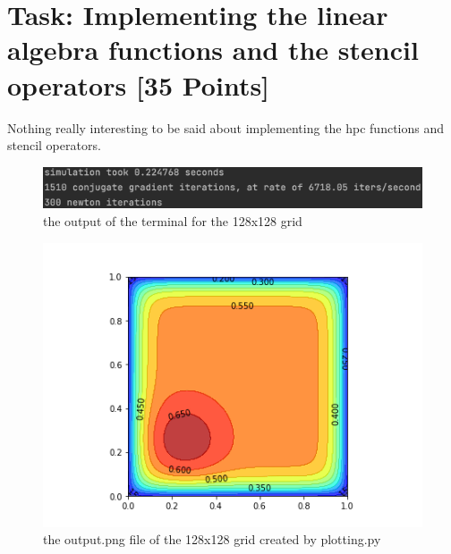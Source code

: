 \documentclass[unicode,11pt,a4paper,oneside,numbers=endperiod,openany]{scrartcl}
\begin{document}
\setassignment
{}

\newline

\section{Task: Implementing the linear algebra functions and the stencil operators [35 Points]}

Nothing really interesting to be said about implementing the hpc functions and stencil operators.
\newline
\begin{figure}[H]
\centering
\includegraphics[width=0.7\linewidth]{terminal128.png}
\caption{the output of the terminal for the 128x128 grid}
\end{figure}

\begin{figure}[H]
\centering
\includegraphics[width=0.7\linewidth]{output128.png}
\caption{the output.png file of the 128x128 grid created by plotting.py}
\end{figure}
\end{document}
